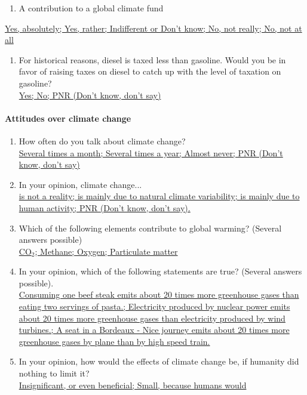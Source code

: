 \documentclass[english,5p,authoryear]{elsarticle}
\begin{document}
\begin{appendices}
\begin{enumerate}[resume,leftmargin=*]
\begin{enumerate}[resume,leftmargin=*]
\item A contribution to a global climate fund 
\end{enumerate}
\end{enumerate}
\uline{Yes, absolutely; Yes, rather; Indifferent or Don't know; No,
not really; No, not at all}
\begin{enumerate}[resume,leftmargin=*]
\item For historical reasons, diesel is taxed less than gasoline. Would
you be in favor of raising taxes on diesel to catch up with the level
of taxation on gasoline? \uline{}\\
\uline{Yes; No; PNR (Don't know, don't say) }
\end{enumerate}

\paragraph{Attitudes over climate change}
\begin{enumerate}[resume,leftmargin=*]
\item How often do you talk about climate change? \uline{}\\
\uline{Several times a month; Several times a year; Almost never; PNR
(Don't know, don't say) }
\item In your opinion, climate change... \uline{}\\
\uline{is not a reality; is mainly due to natural climate variability;
is mainly due to human activity; PNR (Don't know, don't say). }
\item Which of the following elements contribute to global warming? (Several
answers possible) \uline{}\\
\uline{CO$_{2}$; Methane; Oxygen; Particulate matter}
\item In your opinion, which of the following statements are true? (Several
answers possible). \uline{}\\
\uline{Consuming one beef steak emits about 20 times more greenhouse
gases than eating two servings of pasta.; Electricity produced by
nuclear power emits about 20 times more greenhouse gases than electricity
produced by wind turbines.; A seat in a Bordeaux - Nice journey emits
about 20 times more greenhouse gases by plane than by high speed train. }
\item In your opinion, how would the effects of climate change be, if humanity
did nothing to limit it? \uline{}\\
\uline{Insignificant, or even beneficial; Small, because humans would
}
\end{enumerate}
\end{appendices}
\end{document}
